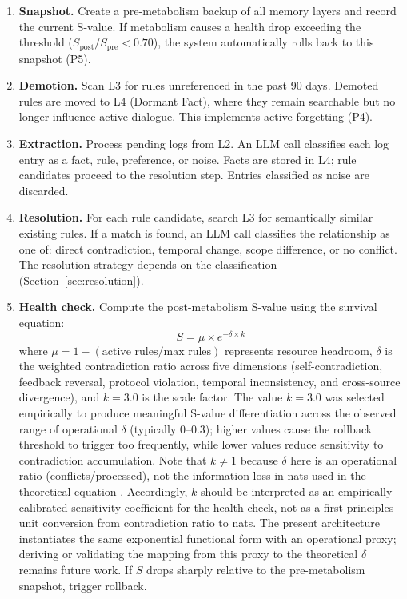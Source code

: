\documentclass[11pt,a4paper]{article}
\begin{document}
\begin{enumerate}\item \textbf{Snapshot.} Create a pre-metabolism backup of all memory layers and record the current S-value. If metabolism causes a health drop exceeding the threshold ($S_{\text{post}} / S_{\text{pre}} < 0.70$), the system automatically rolls back to this snapshot (P5).

\item \textbf{Demotion.} Scan L3 for rules unreferenced in the past 90 days. Demoted rules are moved to L4 (Dormant Fact), where they remain searchable but no longer influence active dialogue. This implements active forgetting (P4).

\item \textbf{Extraction.} Process pending logs from L2. An LLM call classifies each log entry as a fact, rule, preference, or noise. Facts are stored in L4; rule candidates proceed to the resolution step. Entries classified as noise are discarded.

\item \textbf{Resolution.} For each rule candidate, search L3 for semantically similar existing rules. If a match is found, an LLM call classifies the relationship as one of: direct contradiction, temporal change, scope difference, or no conflict. The resolution strategy depends on the classification (Section~\ref{sec:resolution}).

\item \textbf{Health check.} Compute the post-metabolism S-value using the survival equation:
\begin{equation}
S = \mu \times e^{-\delta \times k}
\label{eq:survival}
\end{equation}
where $\mu = 1 - (\text{active rules} / \text{max rules})$ represents resource headroom, $\delta$ is the weighted contradiction ratio across five dimensions (self-contradiction, feedback reversal, protocol violation, temporal inconsistency, and cross-source divergence), and $k = 3.0$ is the scale factor.
The value $k = 3.0$ was selected empirically to produce meaningful S-value differentiation across the observed range of operational $\delta$ (typically 0--0.3); higher values cause the rollback threshold to trigger too frequently, while lower values reduce sensitivity to contradiction accumulation.
Note that $k \neq 1$ because $\delta$ here is an operational ratio (conflicts/processed), not the information loss in nats used in the theoretical equation \citep{sunagawa2026collapse}. Accordingly, $k$ should be interpreted as an empirically calibrated sensitivity coefficient for the health check, not as a first-principles unit conversion from contradiction ratio to nats. The present architecture instantiates the same exponential functional form with an operational proxy; deriving or validating the mapping from this proxy to the theoretical $\delta$ remains future work.
If $S$ drops sharply relative to the pre-metabolism snapshot, trigger rollback.
\end{enumerate}
\end{document}
